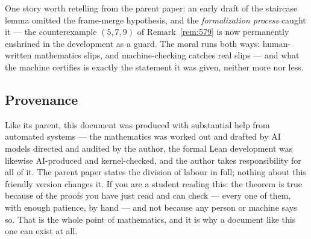\documentclass[11pt,reqno]{amsart}
\theoremstyle{plain}
\theoremstyle{definition}
\theoremstyle{remark}
\begin{document}
One story worth retelling from the parent paper: an early draft of the
staircase lemma omitted the frame-merge hypothesis, and the \emph{formalization
process} caught it --- the counterexample $(5, 7, 9)$ of Remark~\ref{rem:579}
is now permanently enshrined in the development as a guard. The moral runs both
ways: human-written mathematics slips, and machine-checking catches real slips
--- and what the machine certifies is exactly the statement it was given,
neither more nor less.

\subsection{Provenance}

Like its parent, this document was produced with substantial help from
automated systems --- the mathematics was worked out and drafted by AI models
directed and audited by the author, the formal Lean development was likewise
AI-produced and kernel-checked, and the author takes responsibility for all of
it. The parent paper states the division of labour in full; nothing about this
friendly version changes it. If you are a student reading this: the theorem is
true because of the proofs you have just read and can check --- every one of
them, with enough patience, by hand --- and not because any person or machine
says so. That is the whole point of mathematics, and it is why a document like
this one can exist at all.
\end{document}
